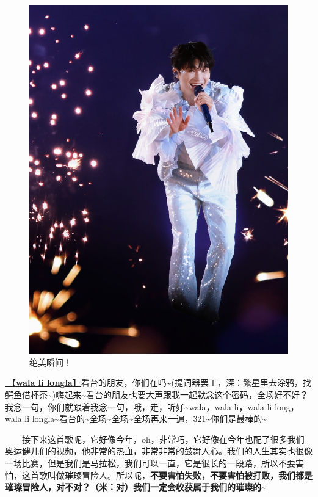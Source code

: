 \documentclass[]{ctexbook}
\begin{document}
\begin{figure}

{\centering \includegraphics[width=450pt]{img/beijing20240921/001} 

}

\caption{绝美瞬间！}\label{fig:unnamed-chunk-100}
\end{figure}

\hyperref[wala-li-longla]{🎵【\textbf{wala li longla}】}看台的朋友，你们在吗\textasciitilde(提词器罢工，深：繁星里去涂鸦，找鳄鱼借杯茶\textasciitilde)嗨起来\textasciitilde 看台的朋友也要大声跟我一起默念这个密码，全场好不好？我念一句，你们就跟着我念一句，哦，走，听好\textasciitilde wala，wala li，wala li long，wala li longla\textasciitilde 看台的\textasciitilde 全场\textasciitilde 全场\textasciitilde 全场再来一遍，321\textasciitilde 你们是最棒的\textasciitilde{}

  接下来这首歌呢，它好像今年，oh，非常巧，它好像在今年也配了很多我们奥运健儿们的视频，他非常的热血，非常非常的鼓舞人心。我们的人生其实也很像一场比赛，但是我们是马拉松，我们可以一直，它是很长的一段路，所以不要害怕，这首歌叫做璀璨冒险人。所以呢，\textbf{不要害怕失败，不要害怕被打败，我们都是璀璨冒险人，对不对？（米：对）我们一定会收获属于我们的璀璨的\textasciitilde{}}
\end{document}
